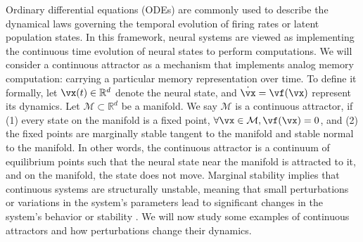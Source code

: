 \documentclass{article} %
\newcounter{ct}
\newcommand{\reals}{\mathbb{R}}
\newcommand{\manifold}{\mathcal{M}}
\theoremstyle{definition}
\theoremstyle{remark}
\renewcommand{\cite}{\citep}
\begin{document}
Ordinary differential equations (ODEs) are commonly used to describe the dynamical laws governing the temporal evolution of firing rates or latent population states\cite{vyas2020}.
In this framework, neural systems are viewed as implementing the continuous time evolution of neural states to perform computations.
We will consider a continuous attractor as a mechanism that implements analog memory computation: carrying a particular memory representation over time.
To define it formally, let \(\vx(t) \in \reals^{d}\) denote the neural state, and \(\dot{\vx} = \vf(\vx)\) represent its dynamics.
Let \(\manifold \subset \reals^{d}\) be a manifold.
We say \(\manifold\) is a continuous attractor, if (1) every state on the manifold is a fixed point, \(\forall \vx \in \manifold, \vf(\vx) = 0\), and (2) the fixed points are marginally stable tangent to the manifold and stable normal to the manifold.
In other words, the continuous attractor is a continuum of equilibrium points such that the neural state near the manifold is attracted to it, and on the manifold, the state does not move.
Marginal stability implies that continuous systems are structurally unstable, meaning that small perturbations or variations in the system's parameters lead to significant changes in the system's behavior or stability \citep{peixoto1959structural, palis2000structural, robbin1971structural, robinson1974structural}.
We will now study some examples of continuous attractors and how perturbations change their dynamics.

\end{document}
